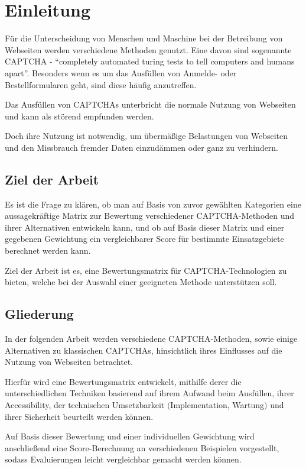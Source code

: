 \chapter{Einleitung}
\label{ch:intro}

Für die Unterscheidung von Menschen und Maschine bei der Betreibung von Webseiten werden verschiedene Methoden genutzt.
Eine davon sind sogenannte CAPTCHA - ``completely automated turing tests to tell computers and humans apart''.
Besonders wenn es um das Ausfüllen von Anmelde- oder Bestellformularen geht, sind diese häufig anzutreffen.

Das Ausfüllen von CAPTCHAs unterbricht die normale Nutzung von Webseiten und kann als störend empfunden werden.

Doch ihre Nutzung ist notwendig, um übermäßige Belastungen von Webseiten und den Missbrauch fremder Daten einzudämmen oder ganz zu verhindern.




%
%
\section{Ziel der Arbeit}
\label{sec:intro:goal}
Es ist die Frage zu klären, ob man auf Basis von zuvor gewählten Kategorien eine aussagekräftige Matrix zur
Bewertung verschiedener CAPTCHA-Methoden und ihrer Alternativen entwickeln kann, und ob auf Basis dieser Matrix und einer gegebenen Gewichtung
ein vergleichbarer Score für bestimmte Einsatzgebiete berechnet werden kann.

Ziel der Arbeit ist es, eine Bewertungsmatrix für CAPTCHA-Technologien zu bieten, welche bei der Auswahl einer geeigneten Methode unterstützen soll.
%
%
\section{Gliederung}
\label{sec:intro:structure}
In der folgenden Arbeit werden verschiedene CAPTCHA-Methoden, sowie einige Alternativen zu klassischen CAPTCHAs,
hinsichtlich ihres Einflusses auf die Nutzung von Webseiten betrachtet.

Hierfür wird eine Bewertungsmatrix entwickelt, mithilfe derer die unterschiedlichen Techniken basierend auf
ihrem Aufwand beim Ausfüllen, ihrer Accessibility, der technischen Umsetzbarkeit $($Implementation, Wartung$)$ und ihrer Sicherheit beurteilt werden können.

Auf Basis dieser Bewertung und einer individuellen Gewichtung wird anschließend eine Score-Berechnung an verschiedenen Beispielen vorgestellt,
sodass Evaluierungen leicht vergleichbar gemacht werden können.